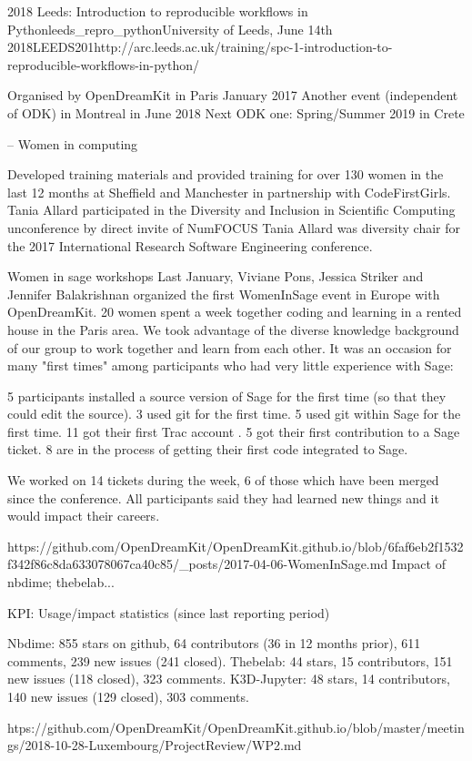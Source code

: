 \begin{Aim 1}
\begin{Aim 2}
\begin{event}{2018 Leeds: Introduction to reproducible workflows in Python}{leeds_repro_python}{University of Leeds, June 14th 2018}{LEEDS}{20}{1}{http://arc.leeds.ac.uk/training/spc-1-introduction-to-reproducible-workflows-in-python/}
\begin{itemize}
    Organised by OpenDreamKit in Paris January 2017
    Another event (independent of ODK) in Montreal in June 2018
    Next ODK one: Spring/Summer 2019 in Crete

-- Women in computing

    Developed training materials and provided training for over 130 women in the last 12 months at Sheffield and Manchester in partnership with CodeFirstGirls.
    Tania Allard participated in the Diversity and Inclusion in Scientific Computing unconference by direct invite of NumFOCUS
    Tania Allard was diversity chair for the 2017 International Research Software Engineering conference.

 
 Women in sage workshops
 Last January, Viviane Pons, Jessica Striker and Jennifer Balakrishnan organized the first WomenInSage event in Europe with OpenDreamKit. 20 women spent a week together coding and learning in a rented house in the Paris area.
We took advantage of the diverse knowledge background of our group to work together and learn from each other. It was an occasion for many "first times" among participants who had very little experience with Sage:

    5 participants installed a source version of Sage for the first time (so that they could edit the source).
    3 used git for the first time.
    5 used git within Sage for the first time.
    11 got their first Trac account .
    5 got their first contribution to a Sage ticket.
    8 are in the process of getting their first code integrated to Sage.

We worked on 14 tickets during the week, 6 of those which have been merged since the conference. All participants said they had learned new things and it would impact their careers.

https://github.com/OpenDreamKit/OpenDreamKit.github.io/blob/6faf6eb2f1532f342f86c8da633078067ca40c85/_posts/2017-04-06-WomenInSage.md
Impact of nbdime; thebelab...

KPI: Usage/impact statistics (since last reporting period)

Nbdime: 855 stars on github, 64 contributors (36 in 12 months prior), 611 
comments, 239 new issues (241 closed).
Thebelab: 44 stars, 15 contributors, 151 new issues (118 closed), 323 
comments.
K3D-Jupyter: 48 stars, 14 contributors, 140 new issues (129 closed), 303 
comments.

htps://github.com/OpenDreamKit/OpenDreamKit.github.io/blob/master/meetings/2018-10-28-Luxembourg/ProjectReview/WP2.md


\end{itemize}
\end{event}
\end{Aim 2}
\end{Aim 1}
